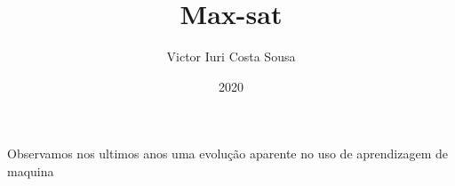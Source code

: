\documentclass[a4paper, 12 pt]{article}
\title{Max-sat}
\author{Victor Iuri Costa Sousa}
\date{2020}
\begin{document}
 Observamos nos ultimos anos uma evolução aparente no uso de aprendizagem de maquina
\end{document}
